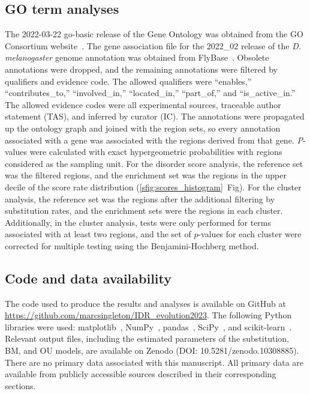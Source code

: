 \subsection{GO term analyses}
The 2022-03-22 go-basic release of the Gene Ontology was obtained from the GO Consortium website~\cite{Ashburner2000, 2020GOConsortium}. The gene association file for the 2022\_02 release of the \textit{D. melanogaster} genome annotation was obtained from FlyBase~\cite{Gramates2022}. Obsolete annotations were dropped, and the remaining annotations were filtered by qualifiers and evidence code. The allowed qualifiers were ``enables,'' ``contributes\_to,'' ``involved\_in,'' ``located\_in,'' ``part\_of,'' and ``is\_active\_in.'' The allowed evidence codes were all experimental sources, traceable author statement (TAS), and inferred by curator (IC). The annotations were propagated up the ontology graph and joined with the region sets, so every annotation associated with a gene was associated with the regions derived from that gene. \textit{P}-values were calculated with exact hypergeometric probabilities with regions considered as the sampling unit. For the disorder score analysis, the reference set was the filtered regions, and the enrichment set was the regions in the upper decile of the score rate distribution (\ref{sfig:scores_histogram}~Fig). For the cluster analysis, the reference set was the regions after the additional filtering by substitution rates, and the enrichment sets were the regions in each cluster. Additionally, in the cluster analysis, tests were only performed for terms associated with at least two regions, and the set of $p$-values for each cluster were corrected for multiple testing using the Benjamini-Hochberg method.

\subsection{Code and data availability}
\begin{sloppypar}
The code used to produce the results and analyses is available on GitHub at \url{https://github.com/marcsingleton/IDR_evolution2023}. The following Python libraries were used: matplotlib~\cite{Hunter2007}, NumPy~\cite{Harris2020}, pandas~\cite{McKinney2010}, SciPy~\cite{Virtanen2020}, and scikit-learn~\cite{Pedregosa2011}. Relevant output files, including the estimated parameters of the substitution, BM, and OU models, are available on Zenodo (DOI: 10.5281/zenodo.10308885). There are no primary data associated with this manuscript. All primary data are available from publicly accessible sources described in their corresponding sections.
\end{sloppypar}

